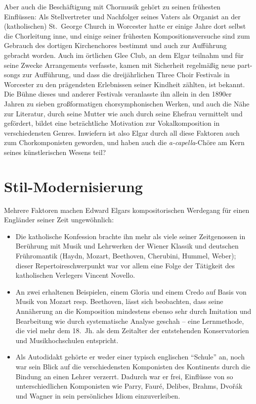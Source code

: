 \documentclass[a4paper,11pt,open=any]{scrbook}
\begin{document}
Aber auch die Beschäftigung mit Chormusik gehört zu seinen frühesten
Einflüssen: Als Stellvertreter und Nachfolger seines Vaters als Organist
an der (katholischen) St.~George Church in Worcester hatte er einige Jahre dort selbst
die Chorleitung inne, und einige seiner frühesten Kompositionsversuche sind
zum Gebrauch des dortigen Kirchenchores bestimmt und auch zur Aufführung
gebracht worden.  Auch im örtlichen Glee Club, an dem Elgar teilnahm und für
seine Zwecke Arrangements verfasste, kamen mit Sicherheit regelmäßig neue
part-songs zur Aufführung, und dass die dreijährlichen Three Choir Festivals
in Worcester zu den prägendsten Erlebnissen seiner Kindheit zählten, ist
bekannt\cite[S.~30f., 43, 57, etc.]{moore}.  Die Bühne dieses und anderer
Festivals veranlasste ihn allein in den 1890er Jahren zu sieben großformatigen
chorsymphonischen Werken, und auch die Nähe zur Literatur, durch seine
Mutter wie auch durch seine Ehefrau vermittelt und gefördert, bildet eine beträchtliche
Motivation zur Vokalkomposition in verschiedensten Genres.  Inwiefern ist
also Elgar durch all diese Faktoren auch zum Chorkomponisten geworden, und
haben auch die \textit{a-capella}-Chöre am Kern seines künstlerischen Wesens
teil?

\section{Stil-Modernisierung}
Mehrere Faktoren machen Edward Elgars kompositorischen Werdegang für einen
Engländer seiner Zeit ungewöhnlich:

\begin{itemize}
 \item Die katholische Konfession brachte ihn mehr als viele seiner
 Zeitgenossen in Berührung mit Musik und Lehrwerken der Wiener Klassik
 und deutschen Frühromantik (Haydn, Mozart, Beethoven, Cherubini, Hummel,
 Weber); dieser Repertoireschwerpunkt war vor allem eine Folge der Tätigkeit
 des katholischen Verlegers Vincent Novello.

 \item An zwei erhaltenen Beispielen, einem Gloria und einem Credo auf Basis
 von Musik von Mozart resp. Beethoven, lässt sich beobachten, dass seine
 Annäherung an die Komposition mindestens ebenso sehr durch Imitation und
 Bearbeitung wie durch systematische Analyse geschah – eine Lernmethode, die
 viel mehr dem 18.~Jh. als dem Zeitalter der entstehenden Konservatorien und
 Musikhochschulen entspricht.

 \item Als Autodidakt gehörte er weder einer typisch englischen
 \enquote{Schule} an, noch war sein Blick auf die verschiedensten
 Komponisten des Kontinents durch die Bindung an einen Lehrer verzerrt.
 Dadurch war er frei, Einflüsse von so unterschiedlichen Komponisten wie
 Parry, Fauré, Delibes, Brahms, Dvořák und Wagner in sein persönliches
 Idiom einzuverleiben.
\end{itemize}
\end{document}
